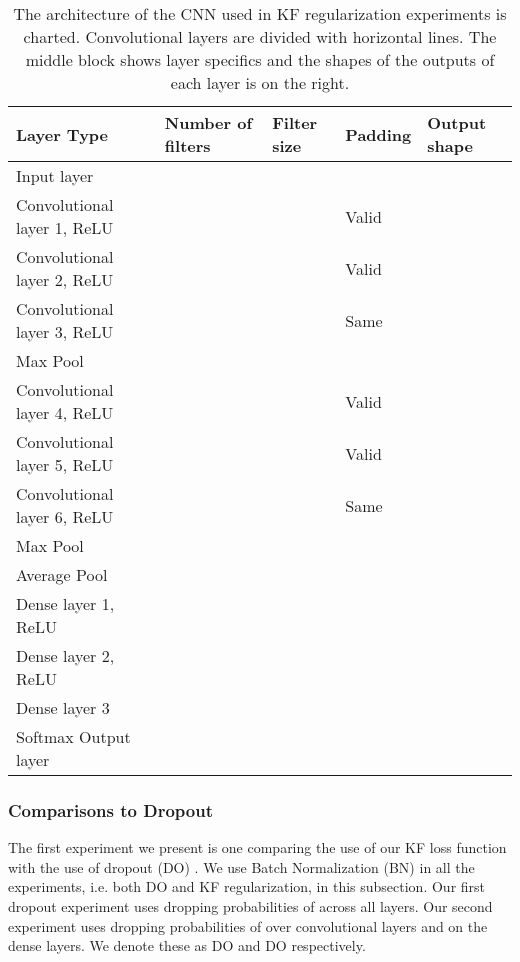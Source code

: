 \documentclass[11pt]{article}
\begin{document}
\begin{table}
{\scriptsize{
\begin{center}
\begin{tabular}{ | p{3.8cm} || p{1.9cm} p{1.9cm} p{1.9cm} | p{3cm} |}
\hline
\textbf{Layer Type} & \textbf{Number of filters} & \textbf{Filter size} & \textbf{Padding} & \textbf{Output shape} \\
\hline
Input layer & & & & \\
\hline
Convolutional layer 1, ReLU &  &  & Valid & \\
\hline
Convolutional layer 2, ReLU &  &  & Valid & \\
\hline
Convolutional layer 3, ReLU &  &  & Same & \\
Max Pool & &  & & \\
\hline
Convolutional layer 4, ReLU &  &  & Valid & \\
\hline
Convolutional layer 5, ReLU &  &  & Valid & \\
\hline
Convolutional layer 6, ReLU &  &  & Same & \\
Max Pool & &  & & \\
Average Pool & &  & & \\
\hline
Dense layer 1, ReLU & & & & \\
\hline
Dense layer 2, ReLU & & & & \\
\hline
Dense layer 3 & & & & \\
\hline
Softmax Output layer & & & & \\
\hline
\end{tabular}
\end{center}
}}
\caption{The architecture of the CNN used in KF regularization experiments is charted.  Convolutional layers are divided with horizontal lines.  The middle block shows layer specifics and the shapes of the outputs of each layer is on the right.}\label{MNIST arch}
\end{table}


\subsubsection{Comparisons to Dropout}
The first experiment we present is one comparing the use of our KF loss function with the use of dropout (DO) \cite{dropout}.  We use Batch Normalization (BN) \cite{batchnorm} in all the experiments, i.e. both DO and KF regularization, in this subsection.  Our first dropout experiment uses dropping probabilities of  across all layers. Our second experiment uses  dropping probabilities of  over convolutional layers and  on the dense layers.  We denote these as DO  and DO  respectively.
\end{document}
